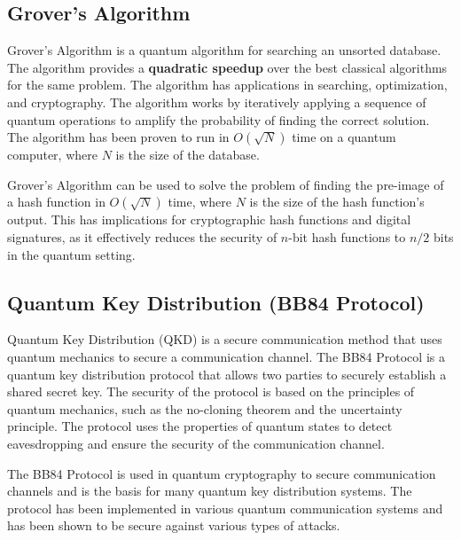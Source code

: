 \documentclass[12pt]{article}
\begin{document}
\subsection{Grover's Algorithm}
Grover's Algorithm is a quantum algorithm for searching an unsorted database\cite{grover}. The algorithm provides a \textbf{quadratic speedup} over the best classical algorithms for the same problem. The algorithm has applications in searching, optimization, and cryptography. The algorithm works by iteratively applying a sequence of quantum operations to amplify the probability of finding the correct solution. The algorithm has been proven to run in $O(\sqrt{N})$ time on a quantum computer, where $N$ is the size of the database.
\par\noindent Grover's Algorithm can be used to solve the problem of finding the pre-image of a hash function in $O(\sqrt{N})$ time, where $N$ is the size of the hash function's output. This has implications for cryptographic hash functions and digital signatures, as it effectively reduces the security of $n$-bit hash functions to $n/2$ bits in the quantum setting.

\subsection{Quantum Key Distribution (BB84 Protocol)}
Quantum Key Distribution (QKD) is a secure communication method that uses quantum mechanics to secure a communication channel. The BB84 Protocol is a quantum key distribution protocol that allows two parties to securely establish a shared secret key\cite{bb84}. The security of the protocol is based on the principles of quantum mechanics, such as the no-cloning theorem and the uncertainty principle. The protocol uses the properties of quantum states to detect eavesdropping and ensure the security of the communication channel.
\par\noindent The BB84 Protocol is used in quantum cryptography to secure communication channels and is the basis for many quantum key distribution systems. The protocol has been implemented in various quantum communication systems and has been shown to be secure against various types of attacks.
\end{document}
